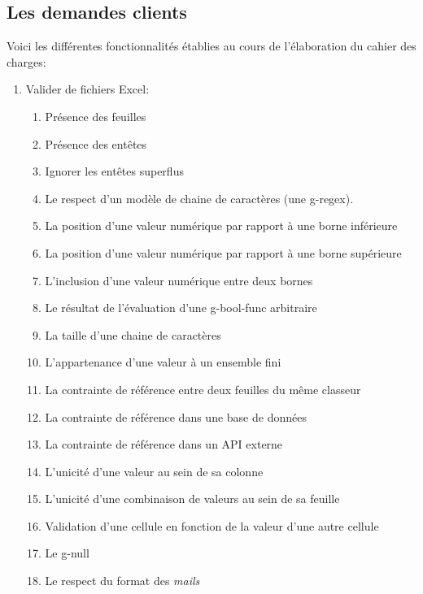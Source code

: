 \subsection{Les demandes clients}
\label{subsec:customer-requests}

Voici les différentes fonctionnalités établies au cours de l'élaboration du cahier des charges:
\begin{enumerate}
    \item Valider de fichiers Excel:
    \begin{enumerate}
        \item Présence des feuilles
        \item Présence des entêtes
        \item Ignorer les entêtes superflus
        \item Le respect d'un modèle de chaine de caractères (une \gls{g-regex}).
        \item La position d'une valeur numérique par rapport à une borne inférieure
        \item La position d'une valeur numérique par rapport à une borne supérieure
        \item L'inclusion d'une valeur numérique entre deux bornes
        \item Le résultat de l'évaluation d'une \gls{g-bool-func} arbitraire
        \item La taille d'une chaine de caractères
        \item L'appartenance d'une valeur à un ensemble fini
        \item La contrainte de référence\fnmark{} entre deux feuilles du même classeur
        \item La contrainte de référence dans une base de données
        \item La contrainte de référence dans un API externe
        \item L'unicité d'une valeur au sein de sa colonne
        \item L'unicité d'une combinaison de valeurs au sein de sa feuille
        \item Validation d'une cellule en fonction de la valeur d'une autre cellule
        \item Le \gls{g-null}
        \item Le respect du format des \textit{mails}

\end{enumerate}
\end{enumerate}
